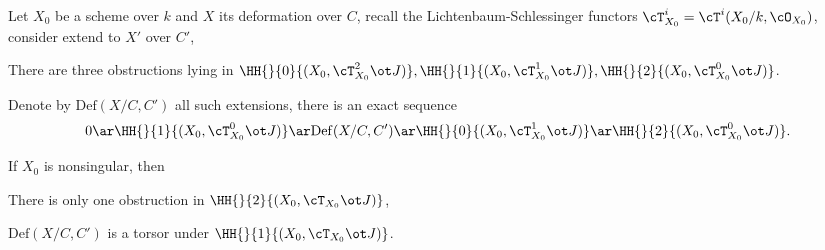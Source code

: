 \documentclass[a4paper, twoside]{article}
\begin{document}
\begin{thm}
	Let $X_{0}$ be a scheme over $k$ and $X$ its deformation over $C$, recall the Lichtenbaum-Schlessinger functors $\cT_{X_{0}}^{i}=\cT^{i}(X_{0}/k,\cO_{X_{0}})$, consider extend to $X'$ over $C'$,
	\begin{itm}
		\item There are three obstructions lying in $\HH{}{0}{(X_{0},\cT_{X_{0}}^{2}\ot J)},\HH{}{1}{(X_{0},\cT_{X_{0}}^{1}\ot J)},\HH{}{2}{(X_{0},\cT_{X_{0}}^{0}\ot J)}$.
		\item Denote by $\mathrm{Def}(X/C,C')$ all such extensions, there is an exact sequence
		\[
			0\ar\HH{}{1}{(X_{0},\cT_{X_{0}}^{0}\ot J)}\ar \mathrm{Def}(X/C,C')\ar \HH{}{0}{(X_{0},\cT_{X_{0}}^{1}\ot J)}\ar\HH{}{2}{(X_{0},\cT_{X_{0}}^{0}\ot J)}.
		\]
	\end{itm}

	If $X_{0}$ is nonsingular, then
	\begin{itm}
		\item There is only one obstruction in $\HH{}{2}{(X_{0},\cT_{X_{0}}\ot J)}$,
		\item $\mathrm{Def}(X/C,C')$ is a torsor under $\HH{}{1}{(X_{0},\cT_{X_{0}}\ot J)}$.
	\end{itm}
\end{thm}


\printref
\end{document}
